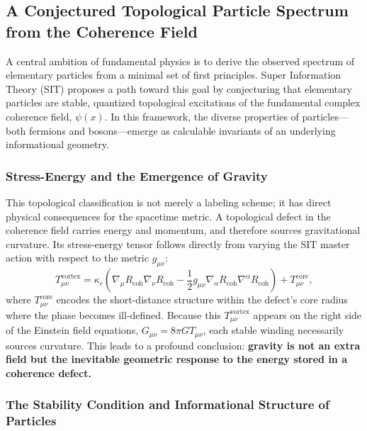 \documentclass[american,11pt,letterpaper]{article}
\def\emph#1{#1}%
\begin{document}
\subsection{A Conjectured Topological Particle Spectrum from the Coherence Field}

A central ambition of fundamental physics is to derive the observed spectrum of elementary particles from a minimal set of first principles. Super Information Theory (SIT) proposes a path toward this goal by conjecturing that elementary particles are stable, quantized topological excitations of the fundamental complex coherence field, $\psi(x)$. In this framework, the diverse properties of particles---both fermions and bosons---emerge as calculable invariants of an underlying informational geometry.

\subsubsection{Stress-Energy and the Emergence of Gravity}

This topological classification is not merely a labeling scheme; it has direct physical consequences for the spacetime metric. A topological defect in the coherence field carries energy and momentum, and therefore sources gravitational curvature. Its stress-energy tensor follows directly from varying the SIT master action with respect to the metric $g_{\mu\nu}$:
\begin{equation}
    T_{\mu\nu}^{\text{vortex}} = \kappa_{c}\left(\nabla_{\mu} R_{\text{coh}}\nabla_{\nu} R_{\text{coh}} - \frac{1}{2} g_{\mu\nu}\nabla_{\alpha} R_{\text{coh}}\nabla^{\alpha} R_{\text{coh}}\right) + T_{\mu\nu}^{\text{core}},
\end{equation}
where $T_{\mu\nu}^{\text{core}}$ encodes the short-distance structure within the defect's core radius where the phase becomes ill-defined. Because this $T_{\mu\nu}^{\text{vortex}}$ appears on the right side of the Einstein field equations, $G_{\mu\nu} = 8\pi G T_{\mu\nu}$, each stable winding necessarily sources curvature. This leads to a profound conclusion: \textbf{gravity is not an \emph{extra} field but the inevitable geometric response to the energy stored in a coherence defect.}

\subsubsection{The Stability Condition and Informational Structure of Particles}
\end{document}
